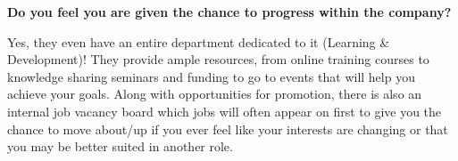 \documentclass{scrartcl}
\begin{document}
\begin{appendices}
\par
\textbf{Do you feel you are given the chance to progress within the company?}
\par
Yes, they even have an entire department dedicated to it (Learning \& Development)! They provide ample resources, from online training courses to knowledge sharing seminars and funding to go to events that will help you achieve your goals. Along with opportunities for promotion, there is also an internal job vacancy board which jobs will often appear on first to give you the chance to move about/up if you ever feel like your interests are changing or that you may be better suited in another role.


\end{appendices}



\end{document}
